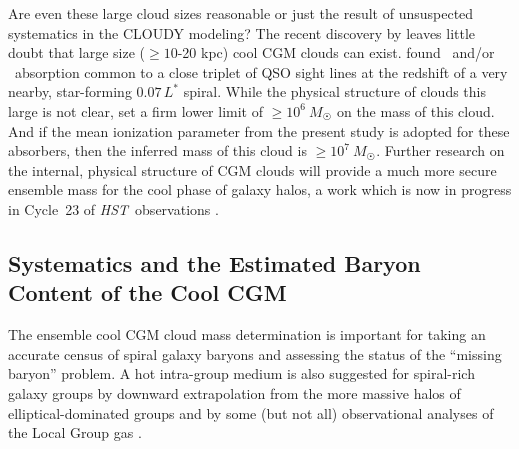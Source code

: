 \documentclass[twocolumn,twocolappendix,tighten,times]{aastex6}
\newcommand{\HI}{\ion{H}{1}}
\newcommand{\CIV}{\ion{C}{4}}
\newcommand{\hst}{{\sl HST}}
\begin{document}
Are even these large cloud sizes reasonable or just the result of unsuspected 
systematics in the CLOUDY modeling?  The recent discovery by \citet{davis15} 
leaves little doubt that large size ($\geq10$-20 kpc) cool CGM clouds can exist. 
\citet{davis15} found \HI\ and/or \CIV\ absorption common to a close triplet of 
QSO sight lines \citep[``The LBQS Triplet'';][]{crighton10} at the redshift of a 
very nearby, star-forming $0.07\,L^*$ spiral. While the physical structure of 
clouds this large is not clear, \citet{davis15} set a firm lower limit of 
$\geq10^6~M_{\Sun}$ on the mass of this cloud. And if the mean ionization 
parameter from the present study is adopted for these absorbers, then the inferred 
mass of this cloud is $\geq10^7~M_{\Sun}$. Further research on the internal, 
physical structure of CGM clouds will provide a much more secure ensemble mass for 
the cool phase of galaxy halos, a work which is now in progress in Cycle~23 of 
\hst\ observations 
\citep[Guest Observer Program \#14127, M.~Fumagalli, PI; see also][]{bowen16}. 



\subsection{Systematics and the Estimated Baryon Content of the Cool CGM}
\label{ensemble:coshalos}

The ensemble cool CGM cloud mass determination is important for taking an accurate 
census of spiral galaxy baryons and assessing the status of the ``missing baryon'' 
problem. 
A hot intra-group medium is also suggested for spiral-rich galaxy groups by 
downward extrapolation from the more massive halos of elliptical-dominated groups 
\citep{mulchaey00} and by some (but not all) observational analyses of the Local 
Group gas \citep[e.g.,][]{anderson11,gupta12, faerman16}.
\end{document}
